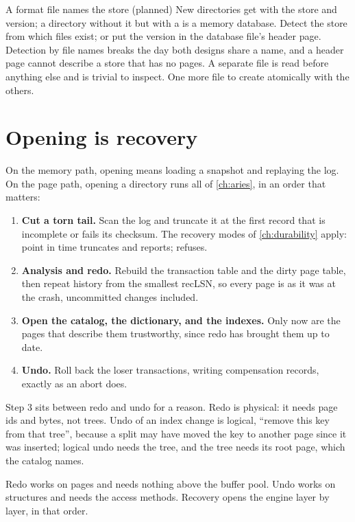 \begin{decision}{A format file names the store (planned)}
 New directories get  with the store and version;
a directory without it but with a  is a memory database.
 Detect the store from which files exist; or put the
version in the database file's header page.
 Detection by file names breaks the day both designs share a name,
and a header page cannot describe a store that has no pages. A separate file
is read before anything else and is trivial to inspect.
 One more file to create atomically with the others.
\end{decision}

\section{Opening is recovery}

On the memory path, opening means loading a snapshot and replaying the log.
On the page path, opening a directory runs all of \cref{ch:aries}, in an order
that matters:

\begin{enumerate}
\item \textbf{Cut a torn tail.} Scan the log and truncate it at the first record
that is incomplete or fails its checksum. The recovery modes of
\cref{ch:durability} apply: point in time truncates and reports; 
refuses.
\item \textbf{Analysis and redo.} Rebuild the transaction table and the dirty
page table, then repeat history from the smallest recLSN, so every page is as
it was at the crash, uncommitted changes included.
\item \textbf{Open the catalog, the dictionary, and the indexes.} Only now are
the pages that describe them trustworthy, since redo has brought them up to
date.
\item \textbf{Undo.} Roll back the loser transactions, writing compensation
records, exactly as an abort does.
\end{enumerate}

Step 3 sits between redo and undo for a reason. Redo is physical: it needs
page ids and bytes, not trees. Undo of an index change is logical, ``remove
this key from that tree'', because a split may have moved the key to another
page since it was inserted; logical undo needs the tree, and the tree needs
its root page, which the catalog names.

\begin{keyidea}
Redo works on pages and needs nothing above the buffer pool. Undo works on
structures and needs the access methods. Recovery opens the engine layer by
layer, in that order.
\end{keyidea}

